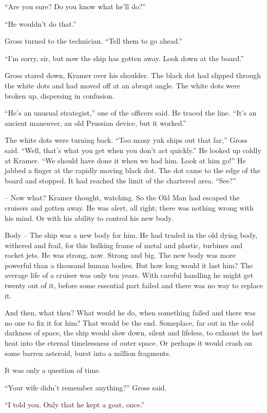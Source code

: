 \documentclass[12pt,a5paper]{book}
\newcommand{\storybreak}{%
  \par\vspace{0.6\baselineskip}
  \begin{center}\color{coveraccent}\small *\enspace *\enspace *\end{center}
  \vspace{0.3\baselineskip}\noindent\ignorespaces
}
\begin{document}
“Are you sure? Do you know what he'll do?”

“He wouldn't do that.”

Gross turned to the technician. “Tell them to go ahead.”

“I'm sorry, sir, but now the ship has gotten away. Look down at the board.”

\storybreak
Gross stared down, Kramer over his shoulder. The black dot had slipped through the white dots and had moved off at an abrupt angle. The white dots were broken up, dispersing in confusion.

“He's an unusual strategist,” one of the officers said. He traced the line. “It's an ancient maneuver, an old Prussian device, but it worked.”

The white dots were turning back. “Too many yuk ships out that far,” Gross said. “Well, that's what you get when you don't act quickly.” He looked up coldly at Kramer. “We should have done it when we had him. Look at him go!” He jabbed a finger at the rapidly moving black dot. The dot came to the edge of the board and stopped. It had reached the limit of the chartered area. “See?”

– Now what? Kramer thought, watching. So the Old Man had escaped the cruisers and gotten away. He was alert, all right; there was nothing wrong with his mind. Or with his ability to control his new body.

Body – The ship was a new body for him. He had traded in the old dying body, withered and frail, for this hulking frame of metal and plastic, turbines and rocket jets. He was strong, now. Strong and big. The new body was more powerful than a thousand human bodies. But how long would it last him? The average life of a cruiser was only ten years. With careful handling he might get twenty out of it, before some essential part failed and there was no way to replace it.

And then, what then? What would he do, when something failed and there was no one to fix it for him? That would be the end. Someplace, far out in the cold darkness of space, the ship would slow down, silent and lifeless, to exhaust its last heat into the eternal timelessness of outer space. Or perhaps it would crash on some barren asteroid, burst into a million fragments.

It was only a question of time.

“Your wife didn't remember anything?” Gross said.

“I told you. Only that he kept a goat, once.”
\end{document}
